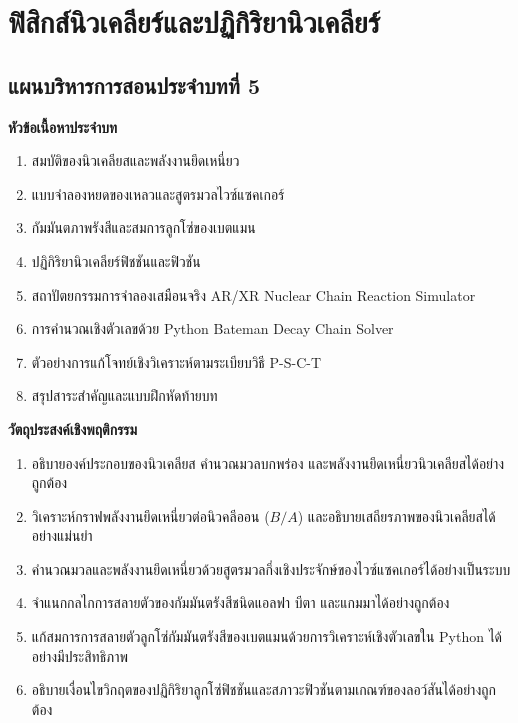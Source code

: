 \chapter{ฟิสิกส์นิวเคลียร์และปฏิกิริยานิวเคลียร์}
\label{chap:nuclear_physics}

\section*{แผนบริหารการสอนประจำบทที่ 5}


\begin{lessonplanbox}
\noindent\textbf{หัวข้อเนื้อหาประจำบท}
\begin{enumerate}
    \item สมบัติของนิวเคลียสและพลังงานยึดเหนี่ยว
    \item แบบจำลองหยดของเหลวและสูตรมวลไวซ์แซคเกอร์
    \item กัมมันตภาพรังสีและสมการลูกโซ่ของเบตแมน
    \item ปฏิกิริยานิวเคลียร์ฟิชชันและฟิวชัน
    \item สถาปัตยกรรมการจำลองเสมือนจริง AR/XR Nuclear Chain Reaction Simulator
    \item การคำนวณเชิงตัวเลขด้วย Python Bateman Decay Chain Solver
    \item ตัวอย่างการแก้โจทย์เชิงวิเคราะห์ตามระเบียบวิธี P-S-C-T
    \item สรุปสาระสำคัญและแบบฝึกหัดท้ายบท
\end{enumerate}

\noindent\textbf{วัตถุประสงค์เชิงพฤติกรรม}
\begin{enumerate}
    \item อธิบายองค์ประกอบของนิวเคลียส คำนวณมวลบกพร่อง และพลังงานยึดเหนี่ยวนิวเคลียสได้อย่างถูกต้อง
    \item วิเคราะห์กราฟพลังงานยึดเหนี่ยวต่อนิวคลีออน ($B/A$) และอธิบายเสถียรภาพของนิวเคลียสได้อย่างแม่นยำ
    \item คำนวณมวลและพลังงานยึดเหนี่ยวด้วยสูตรมวลกึ่งเชิงประจักษ์ของไวซ์แซคเกอร์ได้อย่างเป็นระบบ
    \item จำแนกกลไกการสลายตัวของกัมมันตรังสีชนิดแอลฟา บีตา และแกมมาได้อย่างถูกต้อง
    \item แก้สมการการสลายตัวลูกโซ่กัมมันตรังสีของเบตแมนด้วยการวิเคราะห์เชิงตัวเลขใน Python ได้อย่างมีประสิทธิภาพ
    \item อธิบายเงื่อนไขวิกฤตของปฏิกิริยาลูกโซ่ฟิชชันและสภาวะฟิวชันตามเกณฑ์ของลอว์สันได้อย่างถูกต้อง
\end{enumerate}


\end{lessonplanbox}
